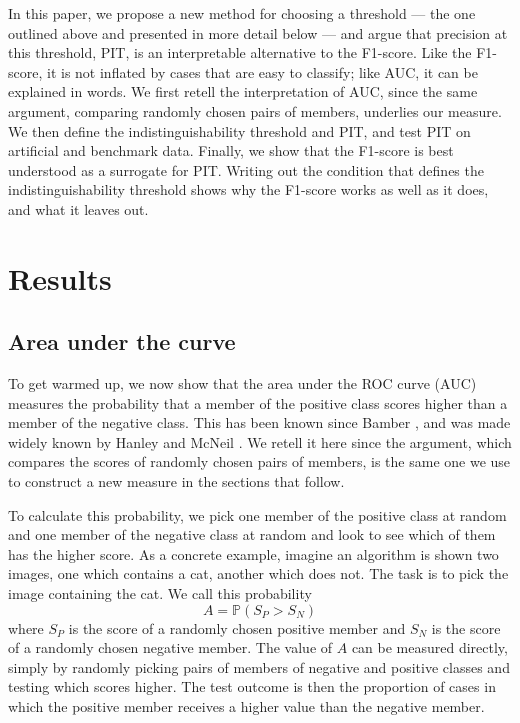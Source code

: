 \documentclass[preprint,12pt]{article}
\newcommand{\prob}{\mathbb{P}}  %
\begin{document}
In this paper, we propose a new method for choosing a threshold --- the one outlined above and presented in more detail below --- and argue that precision at this threshold, PIT, is an interpretable alternative to the F1-score. Like the F1-score, it is not inflated by cases that are easy to classify; like AUC, it can be explained in words. We first retell the interpretation of AUC, since the same argument, comparing randomly chosen pairs of members, underlies our measure. We then define the indistinguishability threshold and PIT, and test PIT on artificial and benchmark data. Finally, we show that the F1-score is best understood as a surrogate for PIT. Writing out the condition that defines the indistinguishability threshold shows why the F1-score works as well as it does, and what it leaves out.

\section*{Results} 


\subsection*{Area under the curve} 
\label{sec:AUC}

To get warmed up, we now show that the area under the ROC curve (AUC) measures the probability that a member of the positive class scores higher than a member of the negative class. This has been known since Bamber \cite{bamber1975area}, and was made widely known by Hanley and McNeil \cite{hanley1982meaning}. We retell it here since the argument, which compares the scores of randomly chosen pairs of members, is the same one we use to construct a new measure in the sections that follow.

To calculate this probability, we pick one member of the positive class at random and one member of the negative class at random and look to see which of them has the higher score. As a concrete example, imagine an algorithm is shown two images, one which contains a cat, another which does not. The task is to pick the image containing the cat. We call this probability 
\[
A = \prob(S_P>S_N)
\]
where $S_P$ is the score of a randomly chosen positive member and $S_N$ is the score of a randomly chosen negative member. The value of $A$ can be measured directly, simply by randomly picking pairs of members of negative and positive classes and testing which scores higher. The test outcome is then the proportion of cases in which the positive member receives a higher value than the negative member.
\end{document}
